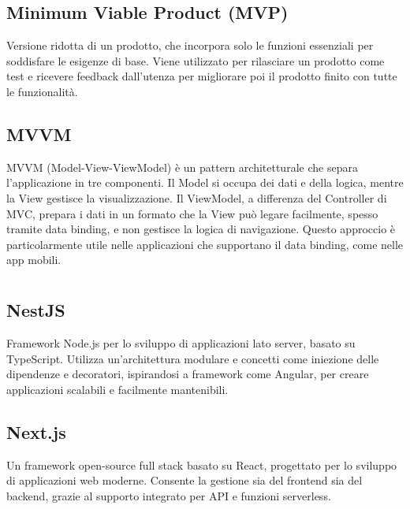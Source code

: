 \hypertarget{sec:MVP}{}
\subsection*{Minimum Viable Product (MVP)}
Versione ridotta di un prodotto, che incorpora solo le funzioni essenziali per soddisfare le esigenze di base. Viene utilizzato per rilasciare un prodotto 
come test e ricevere feedback dall’utenza per migliorare poi il prodotto finito con tutte le funzionalità.

\hypertarget{sec:MVVM}{}
\subsection*{MVVM}
MVVM (Model-View-ViewModel) è un pattern architetturale che separa l'applicazione in tre componenti. 
Il Model si occupa dei dati e della logica, mentre la View gestisce la visualizzazione. 
Il ViewModel, a differenza del Controller di MVC, prepara i dati in un formato che la View può legare facilmente, spesso tramite data binding, e non gestisce la logica di navigazione. 
Questo approccio è particolarmente utile nelle applicazioni che supportano il data binding, come nelle app mobili.
\newpage



\section{}

\hypertarget{sec:nestjs}{}
\subsection*{NestJS}
Framework Node.js per lo sviluppo di applicazioni lato server, basato su TypeScript. Utilizza un'architettura modulare e concetti come iniezione delle 
dipendenze e decoratori, ispirandosi a framework come Angular, per creare applicazioni scalabili e facilmente mantenibili.

\hypertarget{sec:nextjs}{}
\subsection*{Next.js}
Un framework open-source full stack basato su React, progettato per lo sviluppo di applicazioni web moderne. Consente la gestione sia del frontend sia 
del backend, grazie al supporto integrato per API e funzioni serverless.

\hypertarget{sec:nodejs}{}
